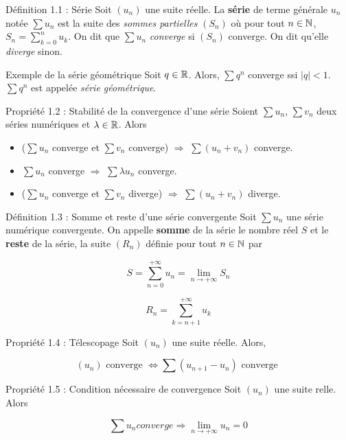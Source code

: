 \begin{theorem}[red]{Définition 1.1 : Série}
    Soit $(u_n)$ une suite réelle. La \textbf{série} de terme générale $u_n$ notée $\sum u_n$ est la suite des \textit{sommes partielles} $(S_n)$ où pour tout $n \in \mathbb{N}$, $\displaystyle S_n = \sum_{k = 0}^{n} u_k$. On dit que $\sum u_n$ \textit{converge} si $(S_n)$ converge. On dit qu'elle \textit{diverge} sinon.
\end{theorem}

\begin{theorem}[black]{Exemple de la série géométrique}
    Soit $q \in \mathbb{R}$. Alors, $\sum q^n$ converge ssi $|q| < 1$. \\
    $\sum q^n$ est appelée \textit{série géométrique}.
\end{theorem}

\begin{theorem}[blue]{Propriété 1.2 : Stabilité de la convergence d'une série}
    Soient $\sum u_n$, $\sum v_n$ deux séries numériques et $\lambda \in \mathbb{R}$. Alors

    \begin{itemize}
        \item ($\sum u_n$ converge et $\sum v_n$ converge) $\Longrightarrow$ $\sum(u_n + v_n)$ converge.
        \item $\sum u_n$ converge $\Longrightarrow$ $\sum \lambda u_n$ converge.
        \item ($\sum u_n$ converge et $\sum v_n$ diverge) $\Longrightarrow$ $\sum(u_n + v_n)$ diverge.
    \end{itemize}
\end{theorem}

\begin{theorem}[red]{Définition 1.3 : Somme et reste d'une série convergente}
    Soit $\sum u_n$ une série numérique convergente. On appelle \textbf{somme} de la série le nombre réel $S$ et le \textbf{reste} de la série, la suite $(R_n)$ définie pour tout $n \in \mathbb{N}$ par

    $$
        S = \sum_{n = 0}^{+ \infty} u_n = \lim_{n \to + \infty} S_n
    $$

    $$
        R_n = \sum_{k = n + 1}^{+ \infty} u_k
    $$
\end{theorem}

\begin{theorem}[blue]{Propriété 1.4 : Télescopage}
    Soit $(u_n)$ une suite réelle. Alors,

    $$
        (u_n) \text{ converge } \Longleftrightarrow \sum (u_{n + 1} - u_n) \text{ converge }
    $$
\end{theorem}

\begin{theorem}[blue]{Propriété 1.5 : Condition nécessaire de convergence}
    Soit $(u_n)$ une suite relle. Alors

    $$
        \sum u_n converge \Longrightarrow \lim_{n \to + \infty} u_n = 0 
    $$
\end{theorem}